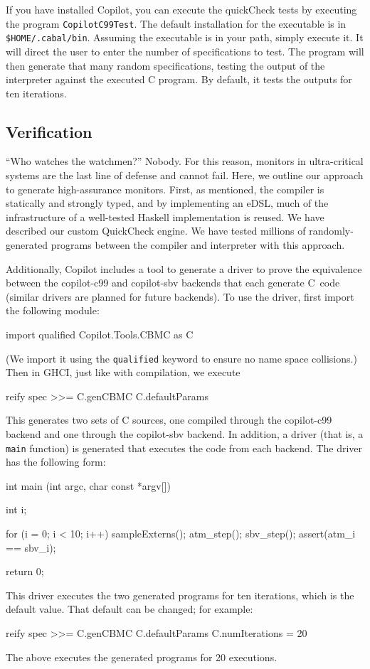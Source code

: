 \documentclass[]{article}
\theoremstyle{example}
\begin{document}
If you have installed Copilot, you can execute the quickCheck tests by executing
the program {\tt CopilotC99Test}.  The default installation for the executable
is in {\tt \$HOME/.cabal/bin}. Assuming the executable is in your path, simply
execute it.  It will direct the user to enter the number of specifications to
test.  The program will then generate that many random specifications, testing
the output of the interpreter against the executed C program.  By default, it
tests the outputs for ten iterations.


\subsection{Verification}
``Who watches the watchmen?''  Nobody.  For this reason, monitors in
ultra-critical systems are the last line of defense and cannot fail.  Here, we
outline our approach to generate high-assurance monitors.  First, as mentioned,
the compiler is statically and strongly typed, and by implementing an eDSL, much
of the infrastructure of a well-tested Haskell implementation is reused.  We
have described our custom QuickCheck engine.  We have tested millions of
randomly-generated programs between the compiler and interpreter with this approach.

Additionally, Copilot includes a tool to generate a driver to prove the
equivalence between the copilot-c99 and copilot-sbv backends that each generate
C~code (similar drivers are planned for future backends).  To use the driver,
first import the following module:
%
\begin{code}
import qualified Copilot.Tools.CBMC as C
\end{code}
%
\noindent
(We import it using the {\tt qualified} keyword to ensure no name space
collisions.)  Then in GHCI, just like with compilation, we execute
%
\begin{code}
reify spec >>= C.genCBMC C.defaultParams  
\end{code}
%
\noindent
This generates two sets of C sources, one compiled through the copilot-c99
backend and one through the copilot-sbv backend.  In addition, a driver (that is, a
{\tt main} function) is generated that executes the code from each backend.  The
driver has the following form:
%
\begin{code}
int main (int argc, char const *argv[])
{
  int i;

  for (i = 0; i < 10; i++)
  {
    sampleExterns();
    atm_step();
    sbv_step();
    assert(atm_i == sbv_i);
  }

  return 0;
}
\end{code}
%
This driver executes the two generated programs for ten iterations, which is the
default value.  That default can be changed; for example:
%
\begin{code}
reify spec >>= 
  C.genCBMC C.defaultParams {C.numIterations = 20}
\end{code}
%
\noindent
The above executes the generated programs for 20 executions.
\end{document}
